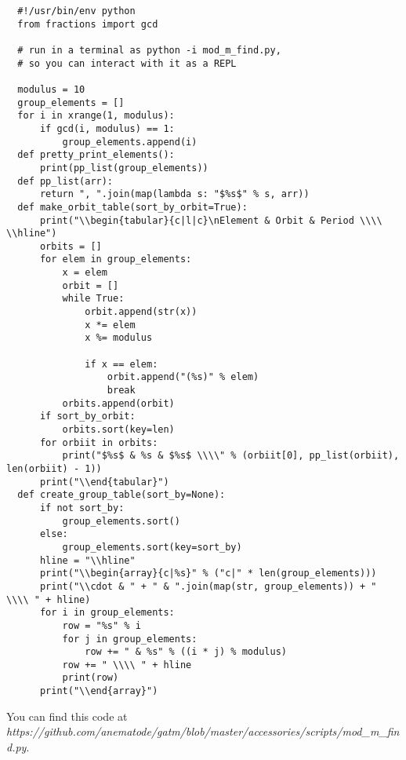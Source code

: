 \documentclass[../key.tex]{subfiles}
\begin{document}
\begin{verbatim}
  #!/usr/bin/env python
  from fractions import gcd

  # run in a terminal as python -i mod_m_find.py,
  # so you can interact with it as a REPL

  modulus = 10
  group_elements = []
  for i in xrange(1, modulus):
      if gcd(i, modulus) == 1:
          group_elements.append(i)
  def pretty_print_elements():
      print(pp_list(group_elements))
  def pp_list(arr):
      return ", ".join(map(lambda s: "$%s$" % s, arr))
  def make_orbit_table(sort_by_orbit=True):
      print("\\begin{tabular}{c|l|c}\nElement & Orbit & Period \\\\ \\hline")
      orbits = []
      for elem in group_elements:
          x = elem
          orbit = []
          while True:
              orbit.append(str(x))
              x *= elem
              x %= modulus

              if x == elem:
                  orbit.append("(%s)" % elem)
                  break
          orbits.append(orbit)
      if sort_by_orbit:
          orbits.sort(key=len)
      for orbiit in orbits:
          print("$%s$ & %s & $%s$ \\\\" % (orbiit[0], pp_list(orbiit), len(orbiit) - 1))
      print("\\end{tabular}")
  def create_group_table(sort_by=None):
      if not sort_by:
          group_elements.sort()
      else:
          group_elements.sort(key=sort_by)
      hline = "\\hline"
      print("\\begin{array}{c|%s}" % ("c|" * len(group_elements)))
      print("\\cdot & " + " & ".join(map(str, group_elements)) + " \\\\ " + hline)
      for i in group_elements:
          row = "%s" % i
          for j in group_elements:
              row += " & %s" % ((i * j) % modulus)
          row += " \\\\ " + hline
          print(row)
      print("\\end{array}")
\end{verbatim}

You can find this code at \textit{https://github.com/anematode/gatm/blob/master/accessories/scripts/mod\_m\_find.py}.
\end{document}
